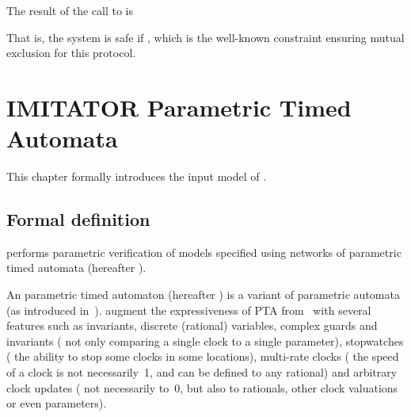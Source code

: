 

The result of the call to \imitator{} is


That is, the system is safe if , which is the well-known constraint ensuring mutual exclusion for this protocol.




\chapter{IMITATOR Parametric Timed Automata}\label{section:IPTA}


This chapter formally introduces the input model of \imitator{}.

\section{Formal definition}\label{section:NIPTA}

\imitator{} performs parametric verification of models specified using networks of \imitator{} parametric timed automata (hereafter \NIPTA{}).

An \imitator{} parametric timed automaton (hereafter \IPTA{}) is a variant of parametric automata (as introduced in~\cite{AHV93}).
\IPTA{} augment the expressiveness of PTA from~\cite{AHV93} with several features such as invariants, discrete (rational) variables, complex guards and invariants (\ie{} not only comparing a single clock to a single parameter), stopwatches (\ie{} the ability to stop some clocks in some locations), multi-rate clocks (\ie{} the speed of a clock is not necessarily~1, and can be defined to any rational) and arbitrary clock updates (\ie{} not necessarily to~0, but also to rationals, other clock valuations or even parameters).


